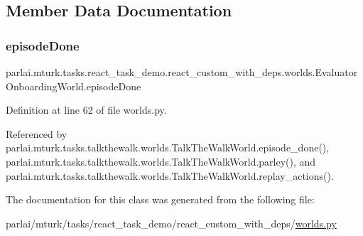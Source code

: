 \subsection{Member Data Documentation}
\mbox{\label{classparlai_1_1mturk_1_1tasks_1_1react__task__demo_1_1react__custom__with__deps_1_1worlds_1_1EvaluatorOnboardingWorld_aef584724f08f16a7b6dcc3cae22bbad5}} 
\subsubsection{\texorpdfstring{episode\+Done}{episodeDone}}
{\footnotesize\ttfamily parlai.\+mturk.\+tasks.\+react\+\_\+task\+\_\+demo.\+react\+\_\+custom\+\_\+with\+\_\+deps.\+worlds.\+Evaluator\+Onboarding\+World.\+episode\+Done}



Definition at line 62 of file worlds.\+py.



Referenced by parlai.\+mturk.\+tasks.\+talkthewalk.\+worlds.\+Talk\+The\+Walk\+World.\+episode\+\_\+done(), parlai.\+mturk.\+tasks.\+talkthewalk.\+worlds.\+Talk\+The\+Walk\+World.\+parley(), and parlai.\+mturk.\+tasks.\+talkthewalk.\+worlds.\+Talk\+The\+Walk\+World.\+replay\+\_\+actions().



The documentation for this class was generated from the following file\+:\begin{DoxyCompactItemize}
\item 
parlai/mturk/tasks/react\+\_\+task\+\_\+demo/react\+\_\+custom\+\_\+with\+\_\+deps/\hyperlink{parlai_2mturk_2tasks_2react__task__demo_2react__custom__with__deps_2worlds_8py}{worlds.\+py}\end{DoxyCompactItemize}
